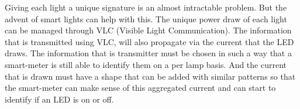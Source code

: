 Giving each light a unique signature is an almost intractable problem.
But the advent of smart lights can help with this.
The unique power draw of each light can be managed through VLC (Visible Light Communication).
The information that is transmitted using VLC, will also propagate via the current that the LED draws.
The information that is transmitter must be chosen in such a way that a smart-meter is still able to identify them on a per lamp basis.
And the current that is drawn must have a shape that can be added with similar patterns so that the smart-meter can make sense of this aggregated current and can start to identify if an LED is on or off.











